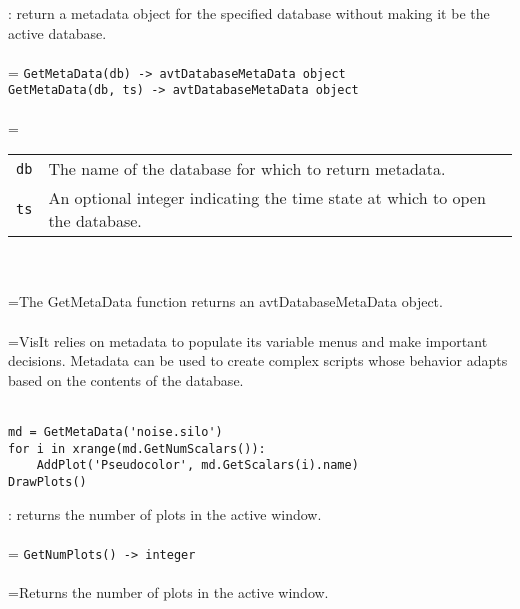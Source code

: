 \documentclass[10pt,a4paper]{report}
\begin{document}
{}
: return a metadata object for the specified database without making it be the active database.\\[-3mm]

 \\ 
\hangindent=\parindent 
\verb!GetMetaData(db) -> avtDatabaseMetaData object!\\ 
\verb!GetMetaData(db, ts) -> avtDatabaseMetaData object!\\ [-3mm]

 \\ 
\hangindent=\parindent 
\begin{tabular}{lp{9cm}}
\verb!db! & The name of the database for which to return metadata. \\
\verb!ts! & An optional integer indicating the time state at which to open the database. \\
\end{tabular} \\[-2mm]


 \\ 
\hangindent=\parindent The GetMetaData function returns an avtDatabaseMetaData object. \\[-3mm] 

 \\ 
\hangindent=\parindent VisIt relies on metadata to populate its variable menus and make important decisions. Metadata can be used to create complex scripts whose behavior adapts based on the contents of the database. \\[-3mm] 

\\[-6mm]
\begin{verbatim}md = GetMetaData('noise.silo')
for i in xrange(md.GetNumScalars()):
    AddPlot('Pseudocolor', md.GetScalars(i).name)
DrawPlots()
\end{verbatim}
\newpage


{}
: returns the number of plots in the active window.\\[-3mm]

 \\ 
\hangindent=\parindent 
\verb!GetNumPlots() -> integer!\\ [-3mm]

 \\ 
\hangindent=\parindent Returns the number of plots in the active window. \\[-3mm] 
\end{document}
